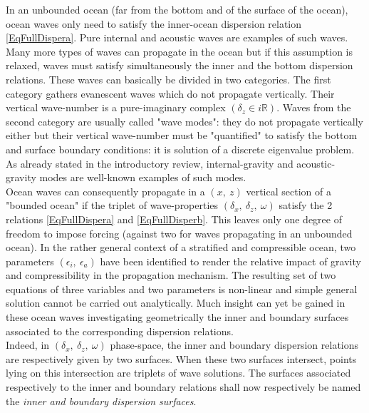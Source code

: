 \documentclass[a4paper,11pt]{article}
\begin{document}
In an unbounded ocean (far from the bottom and of the surface of the ocean), ocean waves only need to satisfy the inner-ocean dispersion relation \ref{EqFullDispera}. Pure internal and acoustic waves are examples of such waves. Many more types of waves can propagate in the ocean but if this assumption is relaxed, waves must satisfy simultaneously the inner and the bottom dispersion relations. These waves can basically be divided in two categories. The first category gathers evanescent waves which do not propagate vertically. Their vertical wave-number is a pure-imaginary complex $(\delta_z\in i\mathbb{R})$. Waves from the second category are usually called "wave modes": they do not propagate vertically either but their vertical wave-number must be "quantified" to satisfy the bottom and surface boundary conditions: it is solution of a discrete eigenvalue problem. As already stated in the introductory review, internal-gravity and acoustic-gravity modes are well-known examples of such modes.\\

Ocean waves can consequently propagate in a $(x,\ z)$ vertical section of a "bounded ocean" if the triplet of wave-properties $(\delta_x,\ \delta_z,\ \omega)$ satisfy the 2 relations \ref{EqFullDispera} and \ref{EqFullDisperb}. This leaves only one degree of freedom to impose forcing (against two for waves propagating in an unbounded ocean). In the rather general context of a stratified and compressible ocean, two parameters $(\epsilon_i,\ \epsilon_a)$ have been identified to render the relative impact of gravity and compressibility in the propagation mechanism. The resulting set of two equations of three variables and two parameters is non-linear and simple general solution cannot be carried out analytically. Much insight can yet be gained in these ocean waves investigating geometrically the inner and boundary surfaces associated to the corresponding dispersion relations. \\
Indeed, in $(\delta_x,\  \delta_z,\ \omega)$ phase-space, the inner and boundary dispersion relations are respectively given by two surfaces. When these two surfaces intersect, points lying on this intersection are triplets of wave solutions. The surfaces associated respectively to the inner and boundary relations shall now respectively be named the \textit{inner and boundary dispersion surfaces}.\\
\end{document}
